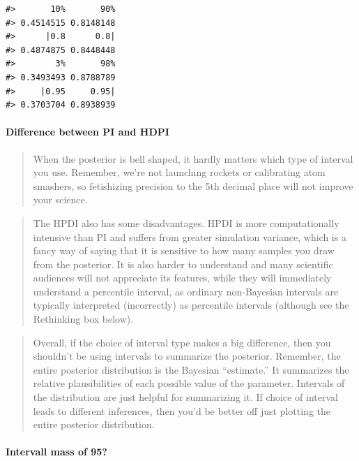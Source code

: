 \documentclass[
  letterpaper,
  DIV=11,
  numbers=noendperiod]{scrreprt}
\let\oldparagraph\paragraph
\renewcommand{\paragraph}[1]{\oldparagraph{#1}\mbox{}}
\begin{document}
\begin{verbatim}
#>       10%       90% 
#> 0.4514515 0.8148148 
#>      |0.8      0.8| 
#> 0.4874875 0.8448448 
#>        3%       98% 
#> 0.3493493 0.8788789 
#>     |0.95     0.95| 
#> 0.3703704 0.8938939
\end{verbatim}

\hypertarget{difference-between-pi-and-hdpi}{%
\paragraph{Difference between PI and
HDPI}\label{difference-between-pi-and-hdpi}}

\begin{quote}
When the posterior is bell shaped, it hardly matters which type of
interval you use. Remember, we're not launching rockets or calibrating
atom smashers, so fetishizing precision to the 5th decimal place will
not improve your science.
\end{quote}

\begin{quote}
The HPDI also has some disadvantages. HPDI is more computationally
intensive than PI and suffers from greater simulation variance, which is
a fancy way of saying that it is sensitive to how many samples you draw
from the posterior. It is also harder to understand and many scientific
audiences will not appreciate its features, while they will immediately
understand a percentile interval, as ordinary non-Bayesian intervals are
typically interpreted (incorrectly) as percentile intervals (although
see the Rethinking box below).
\end{quote}

\begin{quote}
Overall, if the choice of interval type makes a big difference, then you
shouldn't be using intervals to summarize the posterior. Remember, the
entire posterior distribution is the Bayesian ``estimate.'' It
summarizes the relative plausibilities of each possible value of the
parameter. Intervals of the distribution are just helpful for
summarizing it. If choice of interval leads to different inferences,
then you'd be better off just plotting the entire posterior
distribution.
\end{quote}

\hypertarget{intervall-mass-of-95}{%
\paragraph{Intervall mass of 95?}\label{intervall-mass-of-95}}
\end{document}
